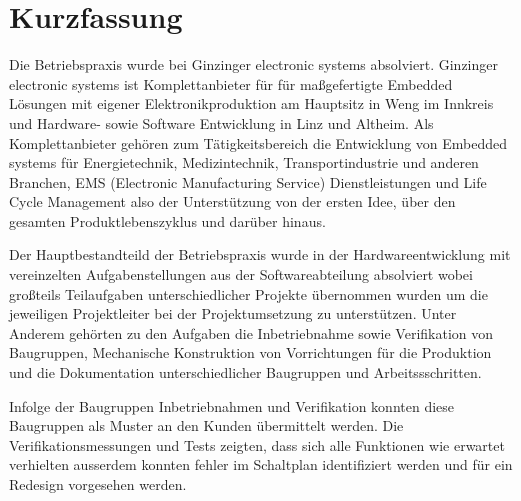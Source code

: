\documentclass[praktikum,german]{hgbthesis}
\begin{document}


\author{Jakob Moser}


\frontmatter
\maketitle
\tableofcontents

\chapter{Kurzfassung}

Die Betriebspraxis wurde bei Ginzinger electronic systems absolviert. 
Ginzinger electronic systems ist Komplettanbieter für für maßgefertigte Embedded Lösungen mit 
eigener Elektronikproduktion am Hauptsitz in Weng im Innkreis und Hardware- sowie Software 
Entwicklung in Linz und Altheim. Als Komplettanbieter gehören zum Tätigkeitsbereich
die Entwicklung von Embedded systems für Energietechnik, Medizintechnik, 
Transportindustrie und anderen Branchen, EMS (Electronic Manufacturing Service) Dienstleistungen und Life Cycle Management 
also der Unterstützung von der ersten Idee, über den gesamten Produktlebenszyklus und darüber hinaus.\cite{Ginzinger}

Der Hauptbestandteild der Betriebspraxis wurde in der Hardwareentwicklung mit vereinzelten Aufgabenstellungen 
aus der Softwareabteilung absolviert wobei großteils Teilaufgaben unterschiedlicher Projekte übernommen wurden um 
die jeweiligen Projektleiter bei der Projektumsetzung zu unterstützen. Unter Anderem gehörten zu den Aufgaben 
die Inbetriebnahme sowie Verifikation von Baugruppen, Mechanische Konstruktion von Vorrichtungen für die 
Produktion und die Dokumentation unterschiedlicher 
Baugruppen und Arbeitssschritten. 

Infolge der Baugruppen Inbetriebnahmen und Verifikation konnten diese Baugruppen 
als Muster an den Kunden übermittelt werden. Die Verifikationsmessungen und Tests
zeigten, dass sich alle Funktionen wie erwartet verhielten ausserdem konnten fehler 
im Schaltplan identifiziert werden und für ein Redesign vorgesehen werden.
\end{document}

